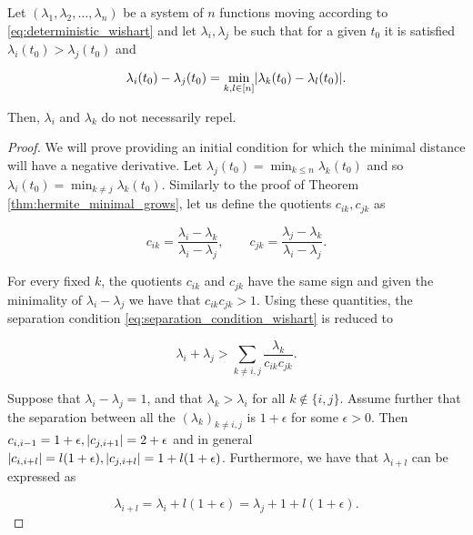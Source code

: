 \begin{theorem} \label{thm:laguerre_does_not_grow}
    Let $(\lambda_1, \lambda_2, \dots, \lambda_n)$ be a system of $n$ functions moving according to \eqref{eq:deterministic_wishart} and let $\lambda_i,\lambda_j$ be such that for a given $t_0$ it is satisfied $\lambda_i(t_0) > \lambda_j(t_0)$ and 
    
    \begin{equation*}
        \lambda_i(t_0) - \lambda_j(t_0) = \min_{k,l \in [n]} \lvert  \lambda_k(t_0) - \lambda_l(t_0) \rvert.
    \end{equation*}

    Then, $\lambda_i$ and $\lambda_k$ do not necessarily repel. 
\end{theorem}

\begin{proof}
    We will prove providing an initial condition for which the minimal distance will have a negative derivative. Let $\lambda_j(t_0) = \min_{k \le n} \lambda_k(t_0)$ and so $\lambda_i(t_0) = \min_{k\neq j} \lambda_k(t_0)$. Similarly to the proof of Theorem \ref*{thm:hermite_minimal_grows}, let us define the quotients $c_{ik},c_{jk}$ as 

    \begin{equation*}
        c_{ik} = \frac{\lambda_i - \lambda_k}{\lambda_i - \lambda_j}, \qquad c_{jk} = \frac{\lambda_j - \lambda_k}{\lambda_i - \lambda_j}.
    \end{equation*}

    For every fixed $k$, the quotients $c_{ik}$ and $c_{jk}$ have the same sign and given the minimality of $\lambda_i - \lambda_j$ we have that $c_{ik}c_{jk}>1$. Using these quantities, the separation condition \eqref{eq:separation_condition_wishart} is reduced to 

    \begin{equation*}
        \lambda_i + \lambda_j > \sum_{k \neq i,j} \frac{\lambda_k}{c_{ik}c_{jk}}.
    \end{equation*}

    Suppose that $\lambda_i - \lambda_j =1$, and that $\lambda_k > \lambda_i$ for all $k \notin \{i,j\}$. Assume further that the separation between all the $(\lambda_k)_{k\neq i,j}$ is $1+\epsilon$ for some $\epsilon >0$. Then $c_{i,i-1}= 1+\epsilon, \lvert c_{j,i+1} \rvert= 2 + \epsilon$ and in general $\lvert c_{i,i+l} \rvert=l(1+\epsilon), \lvert c_{j,i+l} \rvert = 1 + l(1+\epsilon)$. Furthermore, we have that $\lambda_{i+l}$ can be expressed as

    \begin{equation*}
         \lambda_{i+l} = \lambda_i + l(1+\epsilon) = \lambda_j + 1 + l(1+\epsilon).
    \end{equation*}


\end{proof}
